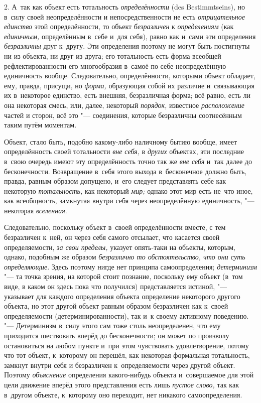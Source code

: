 2. А~так как объект есть тотальность {\em определённости} (des
Bestim\-mtseins), но в~силу своей неопределённости и
непосредственности не есть {\em отрицательное единство}
этой определённости, то объект {\em безразличен} к
{\em определениям} (как {\em единичным,}
определённым в~себе и~для себя), равно как и~сами эти
определения {\em безразличны}
друг к~другу. Эти определения поэтому не могут быть
постигнуты ни из объекта, ни друг из друга; его тотальность есть форма
всеобщей рефлектированности его многообразия в~самоё по себе неопределённую
единичность вообще. Следовательно, определённости, которыми объект
обладает, ему, правда, присущи, но {\em форма,} образующая
собой их различие и~связывающая их в~некоторое единство, есть внешняя,
безразличная форма; всё равно, есть ли она некоторая смесь, или, далее,
некоторый {\em порядок,} известное
{\em расположение} частей
и сторон, всё это "--- соединения, которые безразличны
соотнесённым таким путём моментам.

Объект, стало быть, подобно какому-либо наличному бытию
вообще, имеет определённость своей тотальности
{\em вне себя,} в {\em других} объектах,
эти последние в~свою очередь имеют эту определённость точно так же
{\em вне себя} и~так
далее до бесконечности. Возвращение в~себя этого выхода в~бесконечное
должно быть, правда, равным образом допущено, и~его следует представлять
себе как некоторую {\em тотальность,} как некоторый {\em мир;}
однако этот мир есть не~что иное, как всеобщность, замкнутая
внутри себя через неопределённую единичность, "--- некоторая {\em вселенная}.

Следовательно, поскольку объект в~своей определённости вместе,
с тем безразличен к~ней, он через себя самого отсылает, что касается своей
определяемости, {\em за свои пределы,}
указует опять-таки на объекты, которым, однако, подобным же
образом {\em безразлично то
обстоятельство, что они суть определяющие}. Здесь поэтому
нигде нет принципа самоопределения;
{\em детерминизм} "--- та
точка зрения, на которой стоит познание, поскольку ему объект (в~том виде,
в каком он здесь пока что получился) представляется истиной, "---
указывает для каждого определения объекта определение
некоторого другого объекта, но этот другой объект равным образом
безразличен как к~своей определяемости (детерминированности), так и~к
своему активному поведению. "--- Детерминизм в~силу этого сам
тоже столь неопределенен, что ему приходится шествовать вперёд до
бесконечности; он может по произволу остановиться на любом пункте и~при
этом чувствовать удовлетворение, потому что тот объект, к~которому он
перешёл, как некоторая формальная тотальность, замкнут внутри себя и
безразличен к~определяемости через другой объект. Поэтому {\em объяснение}
определения какого-нибудь объекта и~совершаемое для этой цели
движение вперёд этого представления есть лишь {\em пустое слово,} так
как в~другом объекте, к~которому оно переходит, нет никакого самоопределения.

